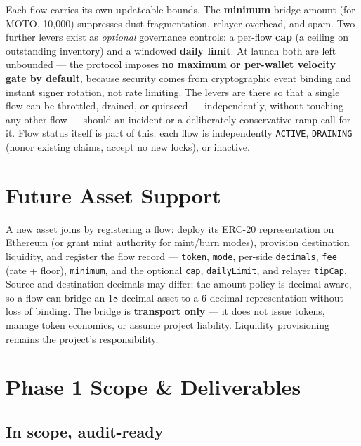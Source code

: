 \documentclass[11pt,a4paper]{article}
\begin{document}
Each flow carries its own updateable bounds. The \textbf{minimum} bridge amount (for MOTO, 10{,}000) suppresses dust fragmentation, relayer overhead, and spam. Two further levers exist as \emph{optional} governance controls: a per-flow \textbf{cap} (a ceiling on outstanding inventory) and a windowed \textbf{daily limit}. At launch both are left unbounded --- the protocol imposes \textbf{no maximum or per-wallet velocity gate by default}, because security comes from cryptographic event binding and instant signer rotation, not rate limiting. The levers are there so that a single flow can be throttled, drained, or quiesced --- independently, without touching any other flow --- should an incident or a deliberately conservative ramp call for it. Flow status itself is part of this: each flow is independently \texttt{ACTIVE}, \texttt{DRAINING} (honor existing claims, accept no new locks), or inactive.

\section{Future Asset Support}

A new asset joins by registering a flow: deploy its ERC-20 representation on Ethereum (or grant mint authority for mint/burn modes), provision destination liquidity, and register the flow record --- \texttt{token}, \texttt{mode}, per-side \texttt{decimals}, \texttt{fee} (rate + floor), \texttt{minimum}, and the optional \texttt{cap}, \texttt{dailyLimit}, and relayer \texttt{tipCap}. Source and destination decimals may differ; the amount policy is decimal-aware, so a flow can bridge an 18-decimal asset to a 6-decimal representation without loss of binding. The bridge is \textbf{transport only} --- it does not issue tokens, manage token economics, or assume project liability. Liquidity provisioning remains the project's responsibility.

\section{Phase 1 Scope \& Deliverables}

\subsection*{In scope, audit-ready}
\end{document}
